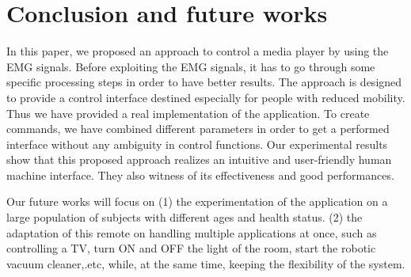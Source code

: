 \documentclass[conference]{IEEEtran}
\begin{document}
\section{Conclusion and future works}
\label{sec:conclusion}
In this paper, we proposed an approach to control a media player by using the EMG signals. Before exploiting the EMG signals,
it has to go through some specific processing steps in order to have better results. The approach is designed to provide a control interface
destined especially for people with reduced mobility.
Thus we have provided a real implementation of the application. To create commands, we have combined different parameters in order to get a performed
interface without any ambiguity in control functions.
Our experimental results show that this proposed approach realizes an intuitive and user-friendly human machine interface. They also witness of its effectiveness and good performances.

Our future works will focus on (1) the experimentation of the application on a large population of subjects with different ages and health status. (2) the adaptation of this remote on handling multiple applications at once, such as controlling a TV, turn ON and OFF the light of the room, start the robotic vacuum cleaner,.etc, while, at the same time, keeping the flexibility of the system.


















%



\end{document}
